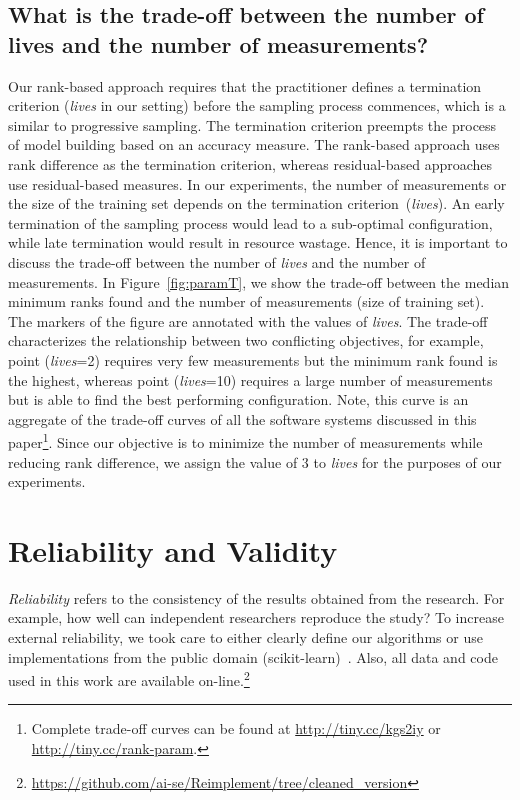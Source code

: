 \documentclass[sigconf]{acmart}
\begin{document}
\subsection{What is the trade-off between the number of lives and the number of measurements?}\label{sec:tradeoff}
Our rank-based approach requires that the practitioner defines a termination criterion (\textit{lives} in our setting) before the sampling process commences, which is a similar to progressive sampling. The termination criterion preempts the process of model building based on an accuracy measure. The rank-based approach uses rank difference as the termination criterion, whereas residual-based approaches use residual-based measures. In our experiments, the number of measurements or the size of the training set depends on the termination criterion~(\textit{lives}). An early termination of the sampling process would lead to a sub-optimal configuration, while late termination would result in resource wastage. Hence, it is important to discuss the trade-off between the number of \textit{lives} and the number of measurements.
In Figure~\ref{fig:paramT}, we show the trade-off between the median minimum ranks found and the number of measurements (size of training set). The markers of the figure are annotated with the values of \textit{lives}. The trade-off characterizes the relationship between two conflicting objectives, for example, point (\textit{lives}=2) requires very few measurements but the minimum rank found is the highest, whereas point (\textit{lives}=10) requires a large number of measurements but is able to find the best performing configuration. Note, this curve is an aggregate of the trade-off curves of all the software systems discussed in this paper\footnote{Complete trade-off curves can be found at \url{http://tiny.cc/kgs2iy} or \url{http://tiny.cc/rank-param}.}.  Since our objective is to minimize the number of measurements while reducing rank difference, we assign the value of $3$ to \textit{lives} for the purposes of our experiments.



\section{Reliability and Validity} 
{\em Reliability} refers to the consistency of the results obtained
from the research.  For example,   how well can independent researchers reproduce the study? To increase external
reliability, we took care to either  clearly define our
algorithms or use implementations from the public domain
(scikit-learn)~\cite{scikit-learn}. Also, all data and code used in this work are available
on-line.\footnote{ 
\url{https://github.com/ai-se/Reimplement/tree/cleaned_version}}
\end{document}
